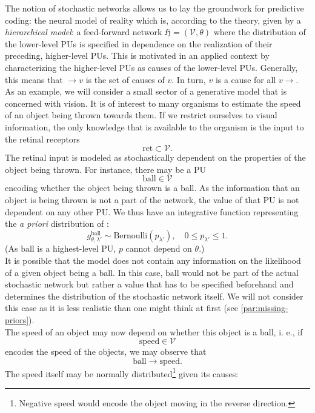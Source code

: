 \documentclass[a4paper,11pt]{report}
\begin{document}
\begin{Par}\label{predicode-1}
The notion of stochastic networks allows us to lay the groundwork for predictive coding: the neural model of reality which is, according to the theory, given by a \emph{hierarchical model}: a feed-forward network $\mathfrak{H}=(\mathcal{V},\theta)$ where the distribution of the lower-level PUs is specified in dependence on the realization of their preceding, higher-level PUs. This is motivated in an applied context by characterizing the higher-level PUs as causes of the lower-level PUs. Generally, this means that $\to v$ is the set of causes of $v$. In turn, $v$ is a cause for all $v\to$.\\
As an example, we will consider a small sector of a generative model that is concerned with vision. It is of interest to many organisms to estimate the speed of an object being thrown towards them. If we restrict ourselves to visual information, the only knowledge that is available to the organism is the input to the retinal receptors
\[
\text{ret}\subset\mathcal{V}.
\]
The retinal input is modeled as stochastically dependent on the properties of the object being thrown. For instance, there may be a PU
\[
\text{ball}\in\mathcal{V}
\]
encoding whether the object being thrown is a ball. As the information that an object is being thrown is not a part of the network, the value of that PU is not dependent on any other PU. We thus have an integrative function representing the \emph{a priori} distribution of :
\[
g^{\text{ball}}_{\theta,\lambda'}\sim\text{Bernoulli}(p_{\lambda'}),
\quad
0\le p_{\lambda'}\le 1.
\]
(As $\text{ball}$ is a highest-level PU, $p$ cannot depend on $\theta$.)\\
It is possible that the model does not contain any information on the likelihood of a given object being a ball. In this case, $\text{ball}$ would not be part of the actual stochastic network but rather a value that has to be specified beforehand and determines the distribution of the stochastic network itself. We will not consider this case as it is less realistic than one might think at first (see \ref{par:missing-priors}).\\
The speed of an object may now depend on whether this object is a ball, i. e., if
\[
\text{speed}\in\mathcal{V}
\]
encodes the speed of the objects, we may observe that 
\[
\text{ball}\to\text{speed}.
\]
The speed itself may be normally distributed\footnote{
Negative speed would encode the object moving in the reverse direction.} given its causes:

\end{Par}
\end{document}
